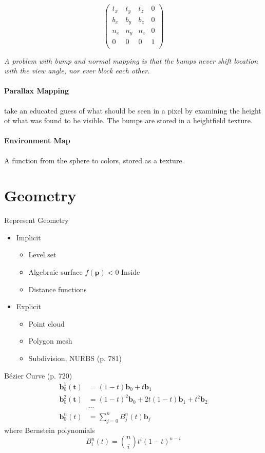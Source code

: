 \documentclass[10pt,a4paper]{article}
\begin{document}
\begin{multicols}{3}
		\begin{equation*}
			\begin{pmatrix}
				t_x & t_y & t_z & 0 \\
				b_x & b_y & b_z & 0 \\
				n_x & n_y & n_z & 0 \\
				0 & 0 & 0 & 1 \\
			\end{pmatrix}
		\end{equation*}

		\emph{A problem with bump and normal mapping is that the bumps
		never shift location with the view angle, nor ever block each
		other. }

		\paragraph{Parallax Mapping} take an educated guess of what should be seen in a pixel by examining the
		height of what was found to be visible. The bumps are stored in a heightfield texture.

		\paragraph{Environment Map} A function from the sphere to colors, stored as a texture.

		\section{Geometry}

			Represent Geometry
		\begin{itemize}
			\item Implicit
			\begin{itemize}
				\item Level set
				\item Algebraic surface $f(\mathbf{p})<0$ Inside
				\item Distance functions
			\end{itemize}
			\item Explicit
			\begin{itemize}
				\item Point cloud
				\item Polygon mesh
				\item Subdivision, NURBS (p. 781)
			\end{itemize}
		\end{itemize}

		B\'{e}zier Curve (p. 720) 
		\begin{align*}
			\mathbf{b}_0^1(\mathbf{t})&=(1-t)\mathbf{b}_0 + t\mathbf{b}_1\\
			\mathbf{b}_0^2(\mathbf{t})&=(1-t)^2\mathbf{b}_0 + 2t(1-t)\mathbf{b}_1 + t^2 \mathbf{b}_2 \\
			&\cdots \\
			\mathbf{b}_0^n(t) &= \sum_{j=0}^nB_j^n(t) \mathbf{b}_j
		\end{align*}
		where Bernstein polynomials
		\begin{equation*}
			B_i^n(t) = \binom{n}{i}t^i(1-t)^{n-i}
		\end{equation*}


\end{multicols}
\end{document}
